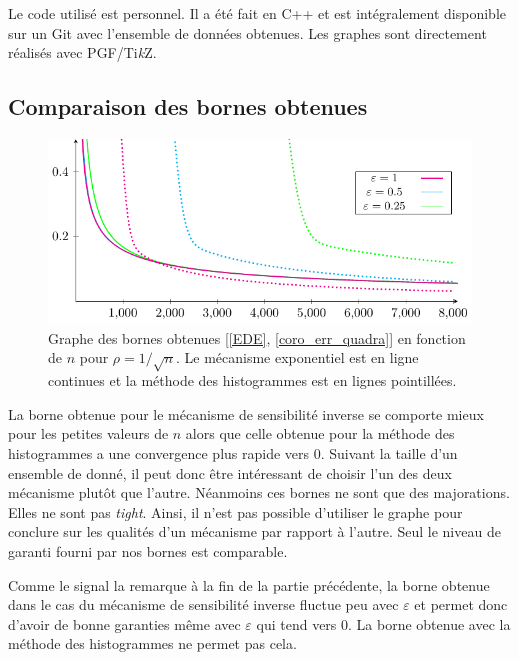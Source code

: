 Le code utilisé est personnel. Il a été fait en C++ et est intégralement disponible sur un Git \cite{git} avec l'ensemble de données obtenues. Les graphes sont directement réalisés avec PGF/Ti\textit{k}Z. 

\subsection{Comparaison des bornes obtenues}

\begin{figure}[H]
    \centering
    \includegraphics[]{"./proofs/figures/u1Me9JP1u1pCrW1j.pdf"}
    \caption{Graphe des bornes obtenues [\ref{EDE}, \ref{coro_err_quadra}] en fonction de \(n\) pour \(\rho = 1/\sqrt n\). Le mécanisme exponentiel est en ligne continues et la méthode des histogrammes est en lignes pointillées.}
    \label{bcomp}
\end{figure}

La borne obtenue pour le mécanisme de sensibilité inverse se comporte mieux pour les petites valeurs de \(n\) alors que celle obtenue pour la méthode des histogrammes a une convergence plus rapide vers 0. Suivant la taille d'un ensemble de donné, il peut donc être intéressant de choisir l'un des deux mécanisme plutôt que l'autre. Néanmoins ces bornes ne sont que des majorations. Elles ne sont pas \textit{tight}. Ainsi, il n'est pas possible d'utiliser le graphe pour conclure sur les qualités d'un mécanisme par rapport à l'autre. Seul le niveau de garanti fourni par nos bornes est comparable.

\begin{remark}
    Comme le signal la remarque à la fin de la partie précédente, la borne obtenue dans le cas du mécanisme de sensibilité inverse fluctue peu avec \(\varepsilon\) et permet donc d'avoir de bonne garanties même avec \(\varepsilon\) qui tend vers 0. La borne obtenue avec la méthode des histogrammes ne permet pas cela.
\end{remark}

